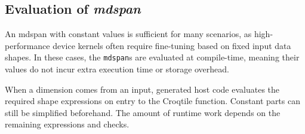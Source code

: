 \subsection*{Evaluation of \emph{mdspan}}

An mdspan with constant values is sufficient for many scenarios, as high-performance device kernels often require fine-tuning based on fixed input data shapes. In these cases, the \texttt{mdspan}s are evaluated at compile-time, meaning their values do not incur extra execution time or storage overhead.

When a dimension comes from an input, generated host code evaluates the required shape expressions on entry to the Croqtile function. Constant parts can still be simplified beforehand. The amount of runtime work depends on the remaining expressions and checks.
